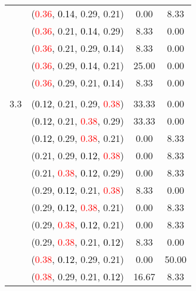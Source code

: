 \documentclass[10pt,a4paper]{report}
\begin{document}
\begin{center}
\begin{longtable}{clcc}
			&(\textcolor{red}{0.36}, \textcolor{black}{0.14}, 0.29, 0.21)&0.00&8.33\\
			&(\textcolor{red}{0.36}, 0.21, \textcolor{black}{0.14}, 0.29)&8.33&0.00\\
			&(\textcolor{red}{0.36}, 0.21, 0.29, \textcolor{black}{0.14})&8.33&0.00\\
			&(\textcolor{red}{0.36}, 0.29, \textcolor{black}{0.14}, 0.21)&25.00&0.00\\
			&(\textcolor{red}{0.36}, 0.29, 0.21, \textcolor{black}{0.14})&8.33&0.00\\
		&&&\\
		3.3			&(\textcolor{black}{0.12}, 0.21, 0.29, \textcolor{red}{0.38})&33.33&0.00\\
			&(\textcolor{black}{0.12}, 0.21, \textcolor{red}{0.38}, 0.29)&33.33&0.00\\
			&(\textcolor{black}{0.12}, 0.29, \textcolor{red}{0.38}, 0.21)&0.00&8.33\\
			&(0.21, 0.29, \textcolor{black}{0.12}, \textcolor{red}{0.38})&0.00&8.33\\
			&(0.21, \textcolor{red}{0.38}, \textcolor{black}{0.12}, 0.29)&0.00&8.33\\
			&(0.29, \textcolor{black}{0.12}, 0.21, \textcolor{red}{0.38})&8.33&0.00\\
			&(0.29, \textcolor{black}{0.12}, \textcolor{red}{0.38}, 0.21)&0.00&8.33\\
			&(0.29, \textcolor{red}{0.38}, \textcolor{black}{0.12}, 0.21)&0.00&8.33\\
			&(0.29, \textcolor{red}{0.38}, 0.21, \textcolor{black}{0.12})&8.33&0.00\\
			&(\textcolor{red}{0.38}, \textcolor{black}{0.12}, 0.29, 0.21)&0.00&50.00\\
			&(\textcolor{red}{0.38}, 0.29, 0.21, \textcolor{black}{0.12})&16.67&8.33\\
		\bottomrule
	\end{longtable}
\end{center}
\end{document}

